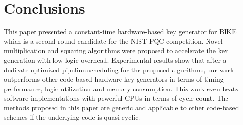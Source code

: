 \documentclass[runningheads]{llncs}
\begin{document}
\section{Conclusions}
\label{sec::conclusion}
This paper presented a constant-time hardware-based key generator for BIKE which is a second-round candidate for the NIST PQC competition. Novel multiplication and squaring algorithms were proposed to accelerate the key generation with low logic overhead. Experimental results show that after a dedicate optimized pipeline scheduling for the proposed algorithms, our work outperforms other code-based hardware key generators in terms of timing performance, logic utilization and memory consumption. This work even beats software implementations with powerful CPUs in terms of cycle count. The methods proposed in this paper are generic and applicable to other code-based schemes if the underlying code is quasi-cyclic.

%
%
%
% 
% 
%


\end{document}
